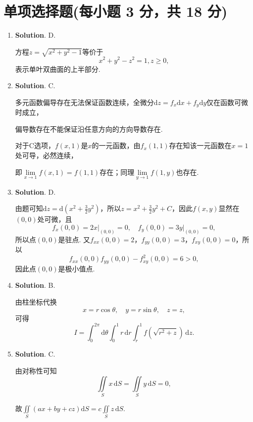 \documentclass[../Main.tex]{subfiles}
\begin{document}
\section{单项选择题(每小题 3 分，共 18 分)}
\begin{enumerate}
  \item \textbf{Solution}. D.

        方程$z=\sqrt{x^2+y^2-1}$等价于
        \[
          x^2+y^2-z^2=1,z\geq0,
        \]
        表示单叶双曲面的上半部分.

  \item \textbf{Solution}. C.

        多元函数偏导存在无法保证函数连续，全微分$\mathrm{d}z=f_x\mathrm{d}x+f_y\mathrm{d}y$仅在函数可微时成立，

        偏导数存在不能保证沿任意方向的方向导数存在.

        对于C选项，$f(x,1)$是$x$的一元函数，由$f_x(1,1)$存在知该一元函数在$x=1$处可导，必然连续，

        即$\lim\limits_{x\to1}f(x,1)=f(1,1)$存在；同理$\lim\limits_{y\to1}f(1,y)$也存在.

  \item \textbf{Solution}. D.

        由题可知$\mathrm{d}z=\mathrm{d}\left(x^2+\frac{3}{2}y^2\right)$，所以$z=x^2+\frac{3}{2}y^2+C$，因此$f(x,y)$显然在$(0,0)$处可微，且
        \[
          f_{x}(0,0)=2x\big|_{(0,0)}=0,\quad f_{y}(0,0)=3y\big|_{(0,0)}=0,
        \]
        所以点$(0,0)$是驻点. 又$f_{xx}(0,0)=2$，$f_{yy}(0,0)=3$，$f_{xy}(0,0)=0$，所以
        \[
          f_{xx}(0,0)f_{yy}(0,0)-f_{xy}^2(0,0)=6>0,
        \]
        因此点$(0,0)$是极小值点.

  \item \textbf{Solution}. B.

        由柱坐标代换
        \[
          x=r\cos\theta,\quad y=r\sin\theta,\quad z=z,
        \]
        可得
        \[
          I=\int_0^{2\pi}\mathrm{d}\theta\int_0^1 r\,\mathrm{d}r\int_r^1 f(\sqrt{r^2+z})\,\mathrm{d}z.
        \]

  \item \textbf{Solution}. C.

        由对称性可知
        \[
          \iint\limits_{S} x\,\mathrm{d}S=\iint\limits_{S} y\,\mathrm{d}S=0,
        \]

        故$\iint\limits_{S} (ax + by + cz) \mathrm{d}S = c \iint\limits_{S} z\,\mathrm{d}S$.


\end{enumerate}
\end{document}
